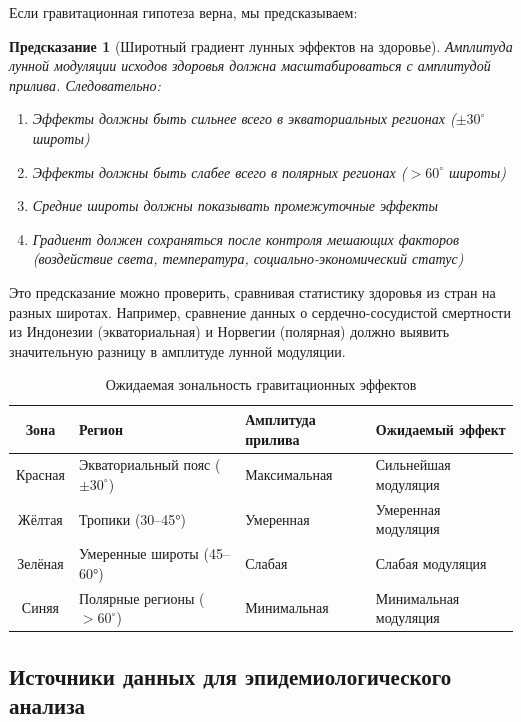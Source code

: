 \documentclass[12pt,a4paper]{article}
\newtheorem{prediction}[theorem]{Предсказание}
\theoremstyle{remark}
\begin{document}
	Если гравитационная гипотеза верна, мы предсказываем:
	
	\begin{prediction}[Широтный градиент лунных эффектов на здоровье]
		Амплитуда лунной модуляции исходов здоровья должна масштабироваться с амплитудой прилива. Следовательно:
		\begin{enumerate}
			\item Эффекты должны быть сильнее всего в экваториальных регионах (\(\pm 30^\circ\) широты)
			\item Эффекты должны быть слабее всего в полярных регионах (\(>60^\circ\) широты)
			\item Средние широты должны показывать промежуточные эффекты
			\item Градиент должен сохраняться после контроля мешающих факторов (воздействие света, температура, социально-экономический статус)
		\end{enumerate}
	\end{prediction}
	
	Это предсказание можно проверить, сравнивая статистику здоровья из стран на разных широтах. Например, сравнение данных о сердечно-сосудистой смертности из Индонезии (экваториальная) и Норвегии (полярная) должно выявить значительную разницу в амплитуде лунной модуляции.
	
	\begin{table}[htbp]
		\centering
		\caption{Ожидаемая зональность гравитационных эффектов}
		\label{tab:zonation}
		\small
		\begin{tabular}{clll}
			\toprule
			\textbf{Зона} & \textbf{Регион} & \textbf{Амплитуда прилива} & \textbf{Ожидаемый эффект} \\
			\midrule
			Красная & Экваториальный пояс (\(\pm 30^\circ\)) & Максимальная & Сильнейшая модуляция \\
			Жёлтая & Тропики (30–45°) & Умеренная & Умеренная модуляция \\
			Зелёная & Умеренные широты (45–60°) & Слабая & Слабая модуляция \\
			Синяя & Полярные регионы (\(>60^\circ\)) & Минимальная & Минимальная модуляция \\
			\bottomrule
		\end{tabular}
	\end{table}
	
	\subsection{Источники данных для эпидемиологического анализа}
	
\end{document}
